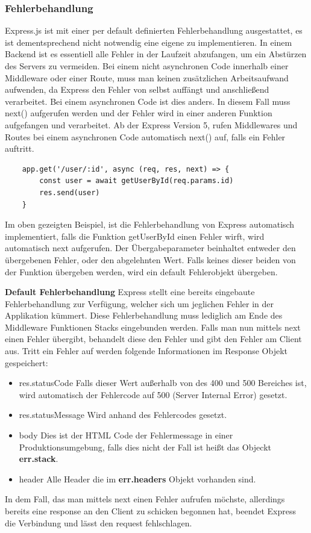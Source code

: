 \subsubsection{Fehlerbehandlung}
Express.js ist mit einer per default definierten Fehlerbehandlung ausgestattet, es ist dementsprechend nicht notwendig eine eigene zu implementieren. In einem Backend ist es essentiell alle Fehler in der Laufzeit abzufangen, um ein Abstürzen des Servers zu vermeiden. Bei einem nicht asynchronen Code innerhalb einer Middleware oder einer Route, muss man keinen zusätzlichen Arbeitsaufwand aufwenden, da Express den Fehler von selbst auffängt und anschließend verarbeitet. Bei einem asynchronen Code ist dies anders. In diesem Fall muss next() aufgerufen werden und der Fehler wird in einer anderen Funktion aufgefangen und verarbeitet. Ab der Express Version 5, rufen Middlewares und Routes bei einem asynchronen Code automatisch next() auf, falls ein Fehler auftritt.
\begin{lstlisting}
    app.get('/user/:id', async (req, res, next) => {
        const user = await getUserById(req.params.id)
        res.send(user)
    }
\end{lstlisting}
Im oben gezeigten Beispiel, ist die Fehlerbehandlung von Express automatisch implementiert, falls die Funktion getUserById einen Fehler wirft, wird automatisch next aufgerufen. Der Übergabeparameter beinhaltet entweder den übergebenen Fehler, oder den abgelehnten Wert. Falls keines dieser beiden von der Funktion übergeben werden, wird ein default Fehlerobjekt übergeben.

\textbf{Default Fehlerbehandlung}
\newline
Express stellt eine bereits eingebaute Fehlerbehandlung zur Verfügung, welcher sich um jeglichen Fehler in der Applikation kümmert. Diese Fehlerbehandlung muss lediglich am Ende des Middleware Funktionen Stacks eingebunden werden. Falls man nun mittels next einen Fehler übergibt, behandelt diese den Fehler und gibt den Fehler am Client aus. Tritt ein Fehler auf werden folgende Informationen im Response Objekt gespeichert:
\begin{itemize}
    \item res.statusCode
        \newline
        Falls dieser Wert außerhalb von des 400 und 500 Bereiches ist, wird automatisch der Fehlercode auf 500 (Server Internal Error) gesetzt.
    \item res.statusMessage
        \newline
        Wird anhand des Fehlercodes gesetzt.
    \item body
        \newline
        Dies ist der HTML Code der Fehlermessage in einer Produktionsumgebung, falls dies nicht der Fall ist heißt das Objeckt \textbf{err.stack}.
    \item header
        \newline
        Alle Header die im \textbf{err.headers} Objekt vorhanden sind.
\end{itemize}
In dem Fall, das man mittels next einen Fehler aufrufen möchste, allerdings bereits eine response an den Client zu schicken begonnen hat, beendet Express die Verbindung und lässt den request fehlschlagen.

